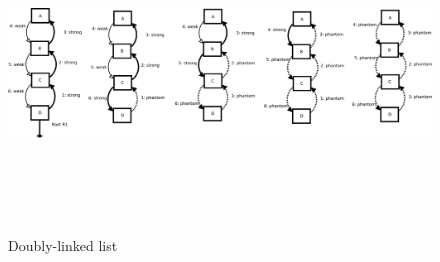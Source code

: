 \begin{figure}[!t]
  \centering
  {\includegraphics[height=3.0in]{figs/doublylinkedlist}\label{fig:example2}}
 \caption{Doubly-linked list}%
  \label{ex2}
\end{figure}



